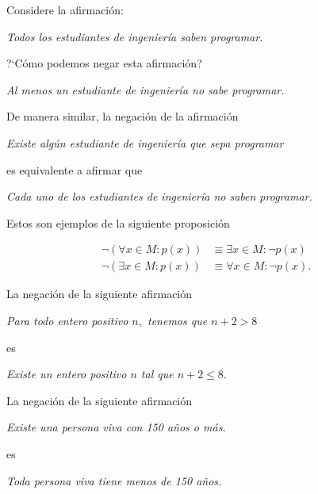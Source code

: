  Considere la afirmación:
 \begin{center}
  \emph{Todos los estudiantes de ingeniería saben programar.}
 \end{center}
?`Cómo podemos negar esta afirmación?


\begin{center}
 \emph{Al menos un estudiante de ingeniería no sabe programar.}
\end{center}


 De manera similar, la negación de la afirmación
 \begin{center}
  \emph{Existe algún estudiante de ingeniería que sepa programar}
 \end{center}
 es equivalente a afirmar que
 \begin{center}
  \emph{Cada uno de los estudiantes de ingeniería no saben programar.}
 \end{center}

Estos son ejemplos de la siguiente proposición

 \begin{teorema}[DeMorgan]
  \begin{align}
  \label{lip:thm:4.4}
   \neg\left( \forall x\in M: p(x) \right)& \equiv \exists x\in M: \neg p(x)\\
   \label{lip:thm:4.5}
   \neg\left( \exists x\in M: p(x) \right)& \equiv \forall x\in M: \neg p(x).
  \end{align}

 \end{teorema}




 \begin{resuelto}
  \label{lip:exmp:4.10.a}
  La negación de la siguiente afirmación
  \begin{center}
   \emph{Para todo entero positivo $n,$ tenemos que $n+2>8$}
  \end{center}
es
\begin{center}
 \emph{Existe un entero positivo $n$ tal que $n+2 \leq 8.$}
\end{center}

 \end{resuelto}




 \begin{resuelto}
  \label{lip:exmp:4.10.b}
  La negación de la siguiente afirmación
  \begin{center}
   \emph{Existe una persona viva con 150 a\~nos o más.}
  \end{center}
 es
 \begin{center}
  \emph{Toda persona viva tiene menos de 150 a\~nos.}
 \end{center}

 \end{resuelto}


